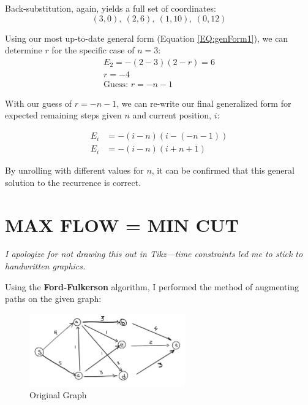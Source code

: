 \documentclass[conference]{styles/acmsiggraph}
\newcommand{\?}{\stackrel{?}{=}}
\DeclareRobustCommand{\myalignbox}[2][gray!20]{%
\begin{tcolorbox}[   %
        breakable,
        left=0pt,
        right=0pt,
        top=0pt,
        bottom=12pt,
        colback=#1,
        colframe=#1,
        width=\dimexpr\textwidth\relax, 
        enlarge left by=0mm,
        boxsep=5pt,
        arc=0pt,outer arc=0pt,
        ]
        #2
\end{tcolorbox}
}
\begin{document}
Back-substitution, again, yields a full set of coordinates:
$$(3,0),\ (2,6),\ (1, 10),\ (0,12)$$

Using our most up-to-date general form (Equation \ref{EQ:genForm1}), we can determine $r$ for the specific case of $n = 3$:
\begin{align*}
    E_2 = -(2-3)(2-r) = 6\\
    r = -4\\
    \text{Guess: } r = -n - 1
\end{align*}

With our guess of $r = -n-1$, we can re-write our final generalized form for expected remaining steps given $n$ and current position, $i$:
\myalignbox{\begin{align}
    E_i &= -(i-n)(i-(-n-1)) \\
    E_i &= -(i-n)(i+n+1)
\end{align}}

By unrolling with different values for $n$, it can be confirmed that this general solution to the recurrence is correct.

\newpage


\section{MAX FLOW = MIN CUT}

\textit{I apologize for not drawing this out in Tikz---time constraints led me to stick to handwritten graphics.}

Using the \textbf{Ford-Fulkerson} algorithm, I performed the method of augmenting paths on the given graph:
\begin{figure}[h!]
    \centering
    \includegraphics[width=0.6\textwidth]{P2 Figs/2.0.PNG}
    \caption{Original Graph}
    \label{fig:2.0}
\end{figure}
\FloatBarrier
\end{document}

